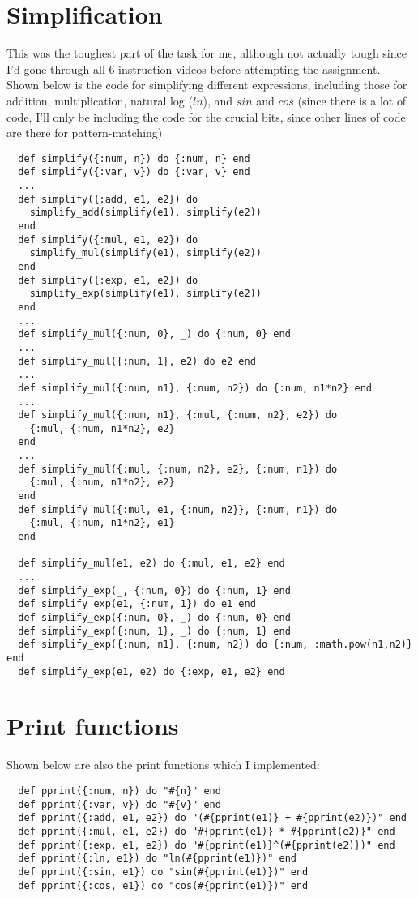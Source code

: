 \documentclass[a4paper,11pt]{article}
\begin{document}
\section*{Simplification}
This was the toughest part of the task for me, although not actually tough since I'd gone through all 6 instruction videos before attempting the assignment. Shown below is the code for simplifying different expressions, including those for addition, multiplication, natural log ($ln$), and $sin$ and $cos$ (since there is a lot of code, I'll only be including the code for the crucial bits, since other lines of code are there for pattern-matching)

\begin{verbatim}
  def simplify({:num, n}) do {:num, n} end
  def simplify({:var, v}) do {:var, v} end
  ...
  def simplify({:add, e1, e2}) do
    simplify_add(simplify(e1), simplify(e2))
  end
  def simplify({:mul, e1, e2}) do
    simplify_mul(simplify(e1), simplify(e2))
  end
  def simplify({:exp, e1, e2}) do
    simplify_exp(simplify(e1), simplify(e2))
  end
  ...
  def simplify_mul({:num, 0}, _) do {:num, 0} end
  ...
  def simplify_mul({:num, 1}, e2) do e2 end
  ...
  def simplify_mul({:num, n1}, {:num, n2}) do {:num, n1*n2} end
  ...
  def simplify_mul({:num, n1}, {:mul, {:num, n2}, e2}) do 
    {:mul, {:num, n1*n2}, e2} 
  end
  ...
  def simplify_mul({:mul, {:num, n2}, e2}, {:num, n1}) do 
    {:mul, {:num, n1*n2}, e2} 
  end
  def simplify_mul({:mul, e1, {:num, n2}}, {:num, n1}) do 
    {:mul, {:num, n1*n2}, e1} 
  end

  def simplify_mul(e1, e2) do {:mul, e1, e2} end
  ...
  def simplify_exp(_, {:num, 0}) do {:num, 1} end
  def simplify_exp(e1, {:num, 1}) do e1 end
  def simplify_exp({:num, 0}, _) do {:num, 0} end
  def simplify_exp({:num, 1}, _) do {:num, 1} end
  def simplify_exp({:num, n1}, {:num, n2}) do {:num, :math.pow(n1,n2)} end
  def simplify_exp(e1, e2) do {:exp, e1, e2} end
\end{verbatim} 

\section*{Print functions}
Shown below are also the print functions which I implemented:
\begin{verbatim}
  def pprint({:num, n}) do "#{n}" end
  def pprint({:var, v}) do "#{v}" end
  def pprint({:add, e1, e2}) do "(#{pprint(e1)} + #{pprint(e2)})" end
  def pprint({:mul, e1, e2}) do "#{pprint(e1)} * #{pprint(e2)}" end
  def pprint({:exp, e1, e2}) do "#{pprint(e1)}^(#{pprint(e2)})" end
  def pprint({:ln, e1}) do "ln(#{pprint(e1)})" end
  def pprint({:sin, e1}) do "sin(#{pprint(e1)})" end
  def pprint({:cos, e1}) do "cos(#{pprint(e1)})" end
\end{verbatim} 
\end{document}
